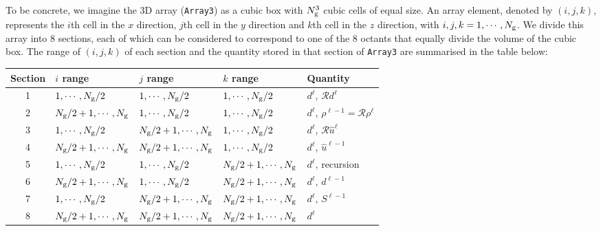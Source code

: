 To be concrete, we imagine the 3D array (\texttt{Array3}) as a cubic box with $N_{\rm g}^3$ cubic cells of equal size. An array element, denoted by $(i,j,k)$, represents the $i$th cell in the $x$ direction, $j$th cell in the $y$ direction and $k$th cell in the $z$ direction, with $i,j,k=1,\cdots,N_{\rm g}$. We divide this array into 8 sections, each of which can be considered to correspond to one of the 8 octants that equally divide the volume of the cubic box. The range of $(i,j,k)$ of each section and the quantity stored in that section of \texttt{Array3} are summarised in the table below: 
\begin{center}
    \begin{tabular}{|c|p{3cm}|p{3cm}|p{3cm}|p{3cm}|}
    \hline
    Section & $i$ range & $j$ range & $k$ range & Quantity\\ 
    \hline
    \hline
    1 & $1,\cdots,N_{\rm g}/2$ & $1,\cdots,N_{\rm g}/2$ & $1,\cdots,N_{\rm g}/2$ & $d^\ell$, $\mathcal{R}d^\ell$ \\ 
    \hline
    2 & $N_{\rm g}/2+1,\cdots,N_{\rm g}$ & $1,\cdots,N_{\rm g}/2$ & $1,\cdots,N_{\rm g}/2$ & $d^\ell$, $\rho^{\ell-1} = \mathcal{R}\rho^\ell$ \\ 
    \hline
    3 & $1,\cdots,N_{\rm g}/2$ & $N_{\rm g}/2+1,\cdots,N_{\rm g}$ & $1,\cdots,N_{\rm g}/2$ & $d^\ell$, $\mathcal{R}\hat{u}^\ell$ \\ 
    \hline
    4 & $N_{\rm g}/2+1,\cdots,N_{\rm g}$ & $N_{\rm g}/2+1,\cdots,N_{\rm g}$ & $1,\cdots,N_{\rm g}/2$ & $d^\ell$, $\hat{u}^{\ell-1}$ \\ \hline
    5 & $1,\cdots,N_{\rm g}/2$ & $1,\cdots,N_{\rm g}/2$ & $N_{\rm g}/2+1,\cdots,N_{\rm g}$ & $d^\ell$, recursion \\ 
    \hline
    6 & $N_{\rm g}/2+1,\cdots,N_{\rm g}$ & $1,\cdots,N_{\rm g}/2$ & $N_{\rm g}/2+1,\cdots,N_{\rm g}$ & $d^\ell$, $d^{\ell-1}$ \\ \hline
    7 & $1,\cdots,N_{\rm g}/2$ & $N_{\rm g}/2+1,\cdots,N_{\rm g}$ & $N_{\rm g}/2+1,\cdots,N_{\rm g}$ & $d^\ell$, $S^{\ell-1}$ \\ \hline
    8 & $N_{\rm g}/2+1,\cdots,N_{\rm g}$ & $N_{\rm g}/2+1,\cdots,N_{\rm g}$ & $N_{\rm g}/2+1,\cdots,N_{\rm g}$ & $d^\ell$ \\
    \hline
    \end{tabular}
\end{center}


